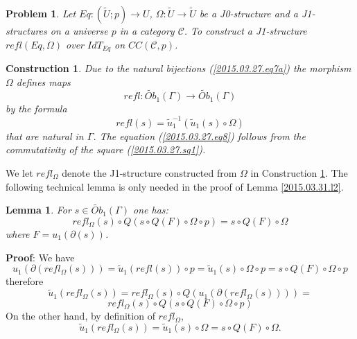 \documentclass[12pt]{article}
\newenvironment{myproof}{{\bf Proof}:}{\vskip 5mm }
\newtheorem{lemma}[proposition]{Lemma}
\newtheorem{problem}[proposition]{Problem}
\newtheorem{construction}[proposition]{Construction}
\newcommand{\llabel}[1]{\label{#1}}
\newcommand{\sr}{\rightarrow}
\newcommand{\wt}{\widetilde}
\begin{document}
%
\begin{problem}
\llabel{2015.03.27.prob4}
Let $Eq:(\wt{U};p)\sr U$, $\Omega:\wt{U}\sr \wt{U}$ be a J0-structure and a J1-structures on a universe $p$ in a category $\mathcal C$. To construct a J1-structure $refl(Eq,\Omega)$ over $IdT_{Eq}$ on $CC({\mathcal C},p)$.
\end{problem}
%
\begin{construction}\rm
\llabel{2015.03.27.constr4}
Due to the natural bijections  (\ref{2015.03.27.eq7a}) the morphism $\Omega$ defines maps
%
$$refl:\wt{Ob}_1(\Gamma)\sr \wt{Ob}_1(\Gamma)$$
%
by the formula
%
$$refl(s)=\wt{u}_1^{-1}(\wt{u}_1(s)\circ \Omega)$$
%
that are natural in $\Gamma$. The equation (\ref{2015.03.27.eq8}) follows from the commutativity of the square (\ref{2015.03.27.sq1}).
\end{construction}
%
We let $refl_{\Omega}$ denote the J1-structure constructed from $\Omega$ in Construction \ref{2015.03.27.constr4}. 
%
The following technical lemma is only needed in the proof of Lemma \ref{2015.03.31.l2}.
%
\begin{lemma}
\llabel{2015.04.02.l3}
For $s\in \wt{Ob}_1(\Gamma)$ one has:
%
$$refl_{\Omega}(s)\circ Q(s\circ Q(F)\circ \Omega\circ p)=s\circ Q(F)\circ \Omega$$
%
where $F=u_1(\partial(s))$.
\end{lemma}
%
\begin{myproof}
We have
%
$$u_1(\partial(refl_{\Omega}(s)))=\wt{u}_1(refl(s))\circ p=\wt{u}_1(s)\circ \Omega\circ p=s\circ Q(F)\circ \Omega\circ p$$
%
therefore
%
$$\wt{u}_1(refl_{\Omega}(s))=refl_{\Omega}(s)\circ Q(u_1(\partial(refl_{\Omega}(s))))=$$
$$refl_{\Omega}(s)\circ Q(s\circ Q(F)\circ \Omega\circ p)$$
%
On the other hand, by definition of $refl_{\Omega}$,
%
$$\wt{u}_1(refl_{\Omega}(s))=\wt{u}_1(s)\circ \Omega=s\circ Q(F)\circ \Omega.$$
%
\end{myproof}
\end{document}
